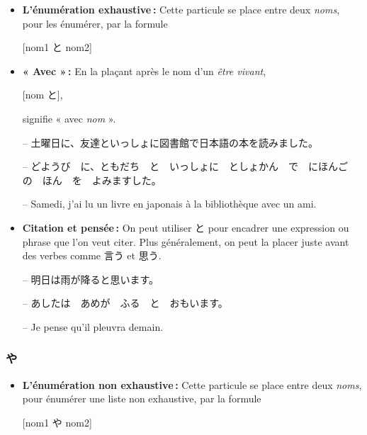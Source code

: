     \begin{itemize}
        \item \textbf{L'énumération exhaustive :} Cette particule se place entre deux \textit{noms}, pour les énumérer, par la formule 
        \begin{center}
            [nom1 と nom2]
        \end{center}
        \item \textbf{« Avec » :} En la plaçant après le nom d'un \textit{être vivant}, 
        \begin{center}
            [nom と],
        \end{center}
         signifie « avec \textit{nom} ».
        \begin{tcolorbox}
            -- 土曜日に、友達といっしょに図書館で日本語の本を読みました。

            -- どようび　に、ともだち　と　いっしょに　としょかん　で　にほんご　の　ほん　を　よみますした。

            -- Samedi, j'ai lu un livre en japonais à la bibliothèque avec un ami.
        \end{tcolorbox}

        \item \textbf{Citation et pensée :} On peut utiliser と pour encadrer une expression ou phrase que l'on veut citer. Plus généralement, on peut la placer juste avant des verbes comme 言う et 思う.
        
        \begin{tcolorbox}
            -- 明日は雨が降ると思います。

            -- あしたは　あめが　ふる　と　おもいます。

            -- Je pense qu'il pleuvra demain.
        \end{tcolorbox}
    \end{itemize}

        \subsubsection{や}

    \begin{itemize}
        \item \textbf{L'énumération non exhaustive :} Cette particule se place entre deux \textit{noms}, pour énumérer une liste non exhaustive, par la formule \begin{center}
            [nom1 や nom2]
        \end{center}
    \end{itemize}

